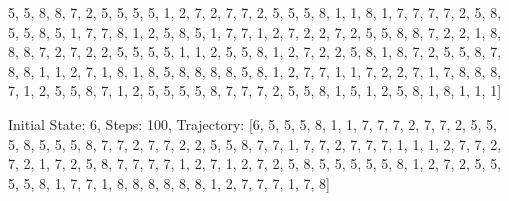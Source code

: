 \documentclass[12pt]{spbstu-task}
\begin{document}
{5, 5, 8, 8, 7, 2, 5, 5, 5, 5, 1, 2, 7, 2, 7, 7, 2, 5, 5, 5, 8, 1, 1, 8, 1, 7, 7, 7, 7, 2, 5, 8, 5, 5, 8, 5, 1, 7, 7, 8, 1, 2, 5, 8, 5, 1, 7, 7, 1, 2, 7, 2, 2, 7, 2, 5, 5, 8, 8, 7, 2, 2, 1, 8, 8, 8, 7, 2, 7, 2, 2, 5, 5, 5, 5, 1, 1, 2, 5, 5, 8, 1, 2, 7, 2, 2, 5, 8, 1, 8, 7, 2, 5, 5, 8, 7, 8, 8, 1, 1, 2, 7, 1, 8, 1, 8, 5, 8, 8, 8, 8, 5, 8, 1, 2, 7, 7, 1, 1, 7, 2, 2, 7, 1, 7, 8, 8, 8, 7, 1, 2, 5, 5, 8, 7, 1, 2, 5, 5, 5, 5, 8, 7, 7, 7, 2, 5, 5, 8, 1, 5, 1, 2, 5, 8, 1, 8, 1, 1, 1]

Initial State: 6, Steps: 100, Trajectory: [6, 5, 5, 5, 8, 1, 1, 7, 7, 7, 2, 7, 7, 2, 5, 5, 5, 8, 5, 5, 5, 8, 7, 7, 2, 7, 7, 2, 2, 5, 5, 8, 7, 7, 1, 7, 7, 2, 7, 7, 7, 1, 1, 1, 2, 7, 7, 2, 7, 2, 1, 7, 2, 5, 8, 7, 7, 7, 7, 1, 2, 7, 1, 2, 7, 2, 5, 8, 5, 5, 5, 5, 5, 8, 1, 2, 7, 2, 5, 5, 5, 5, 8, 1, 7, 7, 1, 8, 8, 8, 8, 8, 8, 1, 2, 7, 7, 7, 1, 7, 8]

}
\end{document}
